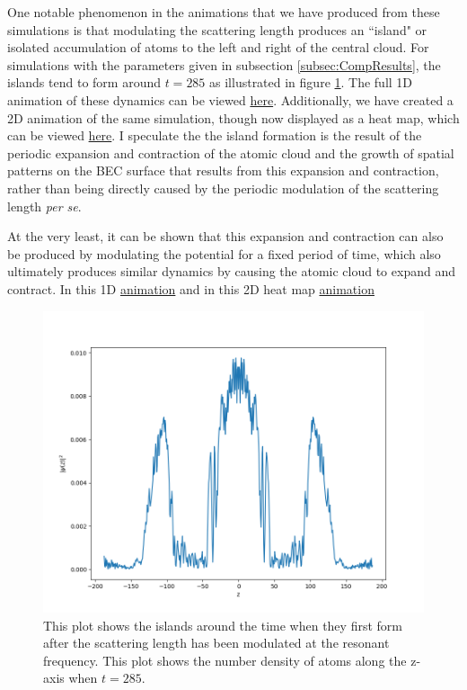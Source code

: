 \documentclass[12]{article}
\begin{document}
One notable phenomenon in the animations that we have produced from these simulations is that modulating the scattering length produces an ``island" or isolated accumulation of atoms to the left and right of the central cloud. For simulations with the parameters given in subsection \ref{subsec:CompResults}, the islands tend to form around $t = 285$ as illustrated in figure \ref{fig:islands1}. The full 1D animation of these dynamics can be viewed \href{https://github.com/TimSkaras/GPE-SpectralMethod/blob/master/Animations/CodnensateAnimation.mp4}{here}. Additionally, we have created a 2D animation of the same simulation, though now displayed as a heat map, which can be viewed \href{https://github.com/TimSkaras/GPE-SpectralMethod/blob/master/Animations/heatMapIslands.mp4}{here}. I speculate the the island formation is the result of the periodic expansion and contraction of the atomic cloud and the growth of spatial patterns on the BEC surface that results from this expansion and contraction, rather than being directly caused by the periodic modulation of the scattering length \textit{per se}. 

At the very least, it can be shown that this expansion and contraction can also be produced by modulating the potential for a fixed period of time, which also ultimately produces similar dynamics by causing the atomic cloud to expand and contract. In this 1D \href{}{animation} and in this 2D heat map \href{}{animation}

\begin{figure}[H]
\centering
\includegraphics[scale=0.6]{IslandFormation1D}
\caption{This plot shows the islands around the time when they first form after the scattering length has been modulated at the resonant frequency. This plot shows the number density of atoms along the z-axis when $t = 285$.}
\label{fig:islands1}
\end{figure}



\end{document}
